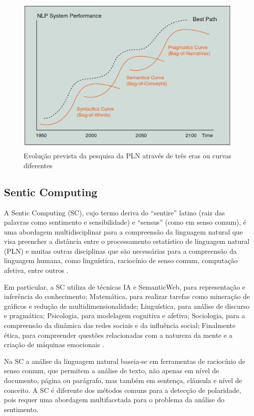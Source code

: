 \documentclass[
	12pt,				%
	openright,			%
	oneside,			%
	a4paper,			%
	english,			%
	spanish,			%
	brazil				%
	]{abntex2}
\begin{document}
\begin{figure}[!h]
\centering
\includegraphics{NLPCurve}
\caption{Evolução prevista da pesquisa da PLN através de três eras ou curvas diferentes \cite{book_Cambria2015}}
\label{NLPCurve}
\end{figure}

\subsection{Sentic Computing}

A Sentic Computing (SC), cujo termo deriva do ``sentire'' latino (raiz das palavras como sentimento e sensibilidade) e ``sensus'' (como em senso comum),  é uma abordagem multidisciplinar para a compreensão da linguagem natural que visa preencher a distância entre o processamento estatístico de linguagem natural (PLN) e muitas outras disciplinas que são necessárias para a compreensão da linguagem humana, como linguística, raciocínio de senso comum, computação afetiva, entre outros \cite{book_Cambria2015}.

Em particular, a SC utiliza de técnicas IA e SemanticWeb, para representação e inferência do conhecimento; Matemática, para realizar tarefas como mineração de gráficos e redução de multidimensionalidade; Linguística, para análise de discurso e pragmática; Psicologia, para modelagem cognitiva e afetiva; Sociologia, para a compreensão da dinâmica das redes sociais e da influência social; Finalmente ética, para compreender questões relacionadas com a natureza da mente e a criação de máquinas emocionais \cite{inBook_Bisio2017}.

Na SC a análise da linguagem natural baseia-se em ferramentas de raciocínio de senso comum, que permitem a análise de texto, não apenas em nível de documento, página ou parágrafo, mas também em sentença, cláusula e nível de conceito. A SC é diferente dos métodos comuns para a detecção de polaridade, pois requer uma abordagem multifacetada para o problema da análise do sentimento.
\end{document}
